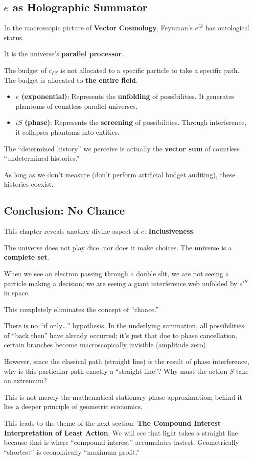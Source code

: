 \subsection{$e$ as Holographic Summator}

In the macroscopic picture of \textbf{Vector Cosmology}, Feynman's $e^{iS}$ has ontological status.

It is the universe's \textbf{parallel processor}.

The budget of $c_{FS}$ is not allocated to a specific particle to take a specific path. The budget is allocated to \textbf{the entire field}.

\begin{itemize}
\item \textbf{$e$ (exponential)}: Represents the \textbf{unfolding} of possibilities. It generates phantoms of countless parallel universes.

\item \textbf{$iS$ (phase)}: Represents the \textbf{screening} of possibilities. Through interference, it collapses phantoms into entities.
\end{itemize}

The ``determined history'' we perceive is actually the \textbf{vector sum} of countless ``undetermined histories.''

As long as we don't measure (don't perform artificial budget auditing), these histories coexist.

\subsection{Conclusion: No Chance}

This chapter reveals another divine aspect of $e$: \textbf{Inclusiveness}.

The universe does not play dice, nor does it make choices. The universe is a \textbf{complete set}.

When we see an electron passing through a double slit, we are not seeing a particle making a decision; we are seeing a giant interference web unfolded by $e^{iS}$ in space.

This completely eliminates the concept of ``chance.''

There is no ``if only\ldots'' hypothesis. In the underlying summation, all possibilities of ``back then'' have already occurred; it's just that due to phase cancellation, certain branches become macroscopically invisible (amplitude zero).

However, since the classical path (straight line) is the result of phase interference, why is this particular path exactly a ``straight line''? Why must the action $S$ take an extremum?

This is not merely the mathematical stationary phase approximation; behind it lies a deeper principle of geometric economics.

This leads to the theme of the next section: \textbf{The Compound Interest Interpretation of Least Action}. We will see that light takes a straight line because that is where ``compound interest'' accumulates fastest. Geometrically ``shortest'' is economically ``maximum profit.''


